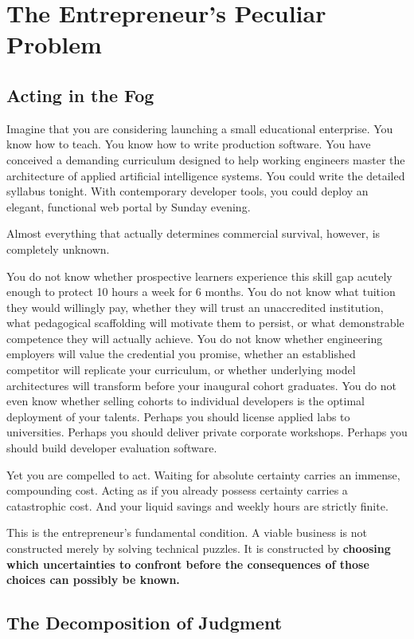 \section{The Entrepreneur's Peculiar Problem}

\subsection{Acting in the Fog}

Imagine that you are considering launching a small educational enterprise. You know how to teach. You know how to write production software. You have conceived a demanding curriculum designed to help working engineers master the architecture of applied artificial intelligence systems. You could write the detailed syllabus tonight. With contemporary developer tools, you could deploy an elegant, functional web portal by Sunday evening.

Almost everything that actually determines commercial survival, however, is completely unknown.

You do not know whether prospective learners experience this skill gap acutely enough to protect 10 hours a week for 6 months. You do not know what tuition they would willingly pay, whether they will trust an unaccredited institution, what pedagogical scaffolding will motivate them to persist, or what demonstrable competence they will actually achieve. You do not know whether engineering employers will value the credential you promise, whether an established competitor will replicate your curriculum, or whether underlying model architectures will transform before your inaugural cohort graduates. You do not even know whether selling cohorts to individual developers is the optimal deployment of your talents. Perhaps you should license applied labs to universities. Perhaps you should deliver private corporate workshops. Perhaps you should build developer evaluation software.

Yet you are compelled to act. Waiting for absolute certainty carries an immense, compounding cost. Acting as if you already possess certainty carries a catastrophic cost. And your liquid savings and weekly hours are strictly finite.

This is the entrepreneur's fundamental condition. A viable business is not constructed merely by solving technical puzzles. It is constructed by \textbf{choosing which uncertainties to confront before the consequences of those choices can possibly be known.}

\subsection{The Decomposition of Judgment}

